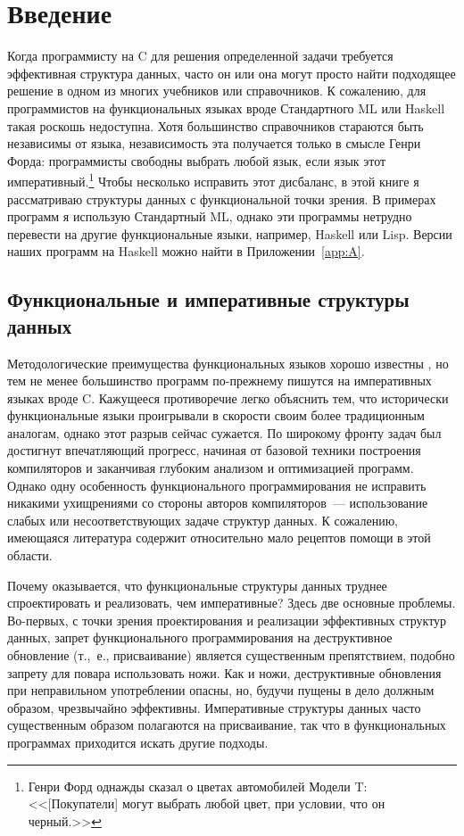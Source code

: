 \chapter{Введение}
\label{ch:1}

Когда программисту на C для решения определенной задачи требуется
эффективная структура данных, часто он или она могут просто найти
подходящее решение в одном из многих учебников или справочников. К
сожалению, для программистов на функциональных языках вроде
Стандартного ML или Haskell такая роскошь недоступна.  Хотя большинство
справочников стараются быть независимы от языка, независимость эта
получается только в смысле Генри Форда: программисты свободны выбрать
любой язык, если язык этот императивный.\footnote{%
  Генри Форд однажды сказал о цветах автомобилей Модели T:
  <<[Покупатели] могут выбрать любой цвет, при условии, что он черный.>>
}
Чтобы несколько исправить этот дисбаланс, в этой книге я рассматриваю
структуры данных с функциональной точки зрения. В примерах программ я
использую Стандартный ML, однако эти программы нетрудно перевести на
другие функциональные языки, например, Haskell или Lisp. Версии наших
программ на Haskell можно найти в Приложении~\ref{app:A}.

\section{Функциональные и императивные структуры данных}

Методологические преимущества функциональных языков хорошо известны
\cite{Backus1978,Hughes1989,HudakJones1994}, но тем не менее
большинство программ по-прежнему пишутся на императивных языках вроде
C. Кажущееся противоречие легко объяснить тем, что исторически
функциональные языки проигрывали в скорости своим более традиционным
аналогам, однако этот разрыв сейчас сужается.  По широкому фронту
задач был достигнут впечатляющий прогресс, начиная от базовой техники
построения компиляторов и заканчивая глубоким анализом и оптимизацией
программ.  Однако одну особенность функционального программирования не
исправить никакими ухищрениями со стороны авторов компиляторов~---
использование слабых или несоответствующих задаче структур данных. К
сожалению, имеющаяся литература содержит относительно мало рецептов
помощи в этой области.

Почему оказывается, что функциональные структуры данных труднее
спроектировать и реализовать, чем императивные? Здесь две основные
проблемы. Во-первых, с точки зрения проектирования и реализации
эффективных структур данных, запрет функционального программирования
на деструктивное обновление (т.,~е., присваивание) является
существенным препятствием, подобно запрету для повара использовать
ножи. Как и ножи, деструктивные обновления при неправильном
употреблении опасны, но, будучи пущены в дело должным образом,
чрезвычайно эффективны.  Императивные структуры данных часто
существенным образом полагаются на присваивание, так что в
функциональных программах приходится искать другие подходы.

